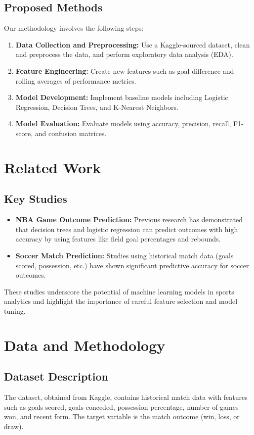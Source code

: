 \documentclass[a4paper,12pt]{article}
\begin{document}
\subsection{Proposed Methods}
Our methodology involves the following steps:
\begin{enumerate}
    \item \textbf{Data Collection and Preprocessing:} Use a Kaggle-sourced dataset, clean and preprocess the data, and perform exploratory data analysis (EDA).
    \item \textbf{Feature Engineering:} Create new features such as goal difference and rolling averages of performance metrics.
    \item \textbf{Model Development:} Implement baseline models including Logistic Regression, Decision Trees, and K-Nearest Neighbors.
    \item \textbf{Model Evaluation:} Evaluate models using accuracy, precision, recall, F1-score, and confusion matrices.
\end{enumerate}

\section{Related Work}
\subsection{Key Studies}
\begin{itemize}
    \item \textbf{NBA Game Outcome Prediction:} Previous research has demonstrated that decision trees and logistic regression can predict outcomes with high accuracy by using features like field goal percentages and rebounds.
    \item \textbf{Soccer Match Prediction:} Studies using historical match data (goals scored, possession, etc.) have shown significant predictive accuracy for soccer outcomes.
\end{itemize}
These studies underscore the potential of machine learning models in sports analytics and highlight the importance of careful feature selection and model tuning.

\section{Data and Methodology}
\subsection{Dataset Description}
The dataset, obtained from Kaggle, contains historical match data with features such as goals scored, goals conceded, possession percentage, number of games won, and recent form. The target variable is the match outcome (win, loss, or draw).
\end{document}
